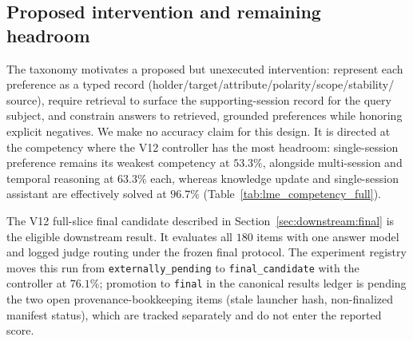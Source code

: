 \subsection{Proposed intervention and remaining headroom}

The taxonomy motivates a proposed but unexecuted intervention: represent each
preference as a typed record (holder/target/attribute/polarity/scope/stability/
source), require retrieval to surface the supporting-session record for the
query subject, and constrain answers to retrieved, grounded preferences while
honoring explicit negatives. We make no accuracy claim for this design. It is
directed at the competency where the V12 controller has the most headroom:
single-session preference remains its weakest competency at $53.3\%$, alongside
multi-session and temporal reasoning at $63.3\%$ each, whereas knowledge update
and single-session assistant are effectively solved at $96.7\%$
(Table~\ref{tab:lme_competency_full}).



The V12 full-slice final candidate described in
Section~\ref{sec:downstream:final} is the eligible downstream result. It
evaluates all $180$ items with one answer model and logged judge routing under
the frozen final protocol. The experiment registry moves this run from
\texttt{externally\_pending} to \texttt{final\_candidate} with the controller at
$76.1\%$; promotion to \texttt{final} in the canonical results ledger is pending
the two open provenance-bookkeeping items (stale launcher hash, non-finalized
manifest status), which are tracked separately and do not enter the reported
score.
